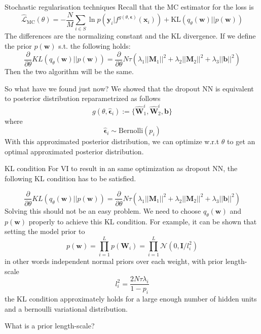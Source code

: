 \documentclass{beamer}
\begin{document}
\begin{frame}[allowframebreaks]{Stochastic regularisation techniques}
Recall that the MC estimator for the loss is 
$$\hat{\mathcal{L}}_{\text{MC}} (\theta)  = - \frac{N}{M}\sum_{i\in S}  \ln p(\mathbf{y}_i | f^{g(\theta, \bm{\epsilon})} (\mathbf{x}_i)) + \text{KL}(q_\theta(\mathbf{w}) || p(\mathbf{w}))$$
The differences are the normalizing constant and the KL divergence.
If we define the prior $p(\mathbf{w})$ s.t. the following holds:
$$\frac{\partial}{\partial \theta} KL(q_\theta (\mathbf{w}) || p(\mathbf{w})) = \frac{\partial}{\partial \theta } N \tau (\lambda_1 || \mathbf{M}_1||^2 + \lambda_2 || \mathbf{M}_2||^2 + \lambda_3 ||\mathbf{b}||^2)$$
Then the two algorithm will be the same.

\framebreak 

So what have we found just now? We showed that the dropout NN is equivalent to posterior distribution reparametrized as follows
$$ g(\theta, \hat{\bm{\epsilon}}_i) := \{ \hat{\mathbf{W}}_1^i, \hat{\mathbf{W}}_2^i, \mathbf{b} \}$$
where $$\hat{\bm{\epsilon}}_i \sim \text{Bernolli}(p_i)$$ 
With this approximated posterior distribution, we can optimize w.r.t $\theta$ to get an optimal approximated posterior distribution.
\end{frame}

\begin{frame}[allowframebreaks]{KL condition}
For VI to result in an same optimization as dropout NN, the following KL condition has to be satisfied.

$$\frac{\partial}{\partial \theta} KL(q_\theta (\mathbf{w}) || p(\mathbf{w})) = \frac{\partial}{\partial \theta } N \tau (\lambda_1 || \mathbf{M}_1||^2 + \lambda_2 || \mathbf{M}_2||^2 + \lambda_3 ||\mathbf{b}||^2)$$
Solving this should not be an easy problem. We need to choose $q_\theta(\mathbf{w})$ and $p(\mathbf{w})$ properly to achieve this KL condition. For example, it can be shown that setting the model prior to 
$$p(\mathbf{w}) = \prod_{i=1}^L p(\mathbf{W}_i) = \prod_{i=1}^L \mathcal{N}(0, \mathbf{I} / l_i^2)$$
in other words independent normal priors over each weight, with prior length-scale 
$$l_i^2 = \frac{2N\tau \lambda_i}{1 - p_i}$$
the KL condition approximately holds for a large enough number of hidden units and a bernoulli variational distribution.

\end{frame}

\begin{frame}{What is a prior length-scale?}
    


\end{frame}
\end{document}
